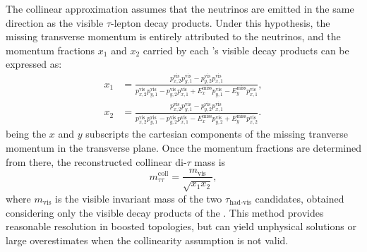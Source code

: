 The collinear approximation assumes that the neutrinos are emitted in the same direction as the visible $\tau$-lepton decay products. Under this hypothesis, the missing transverse momentum is entirely attributed to the neutrinos, and the momentum fractions $x_1$ and $x_2$ carried by each \taul's visible decay products can be expressed as: 
\begin{align}
    x_{1} &= 
    \frac{p_{x,2}^{\text{vis}} p_{y,1}^{\text{vis}} - p_{y,2}^{\text{vis}} p_{x,1}^{\text{vis}}}
         {p_{x,2}^{\text{vis}} p_{y,1}^{\text{vis}} - p_{y,2}^{\text{vis}} p_{x,1}^{\text{vis}} 
          + E_{x}^{\text{miss}} p_{y,1}^{\text{vis}} - E_{y}^{\text{miss}} p_{x,1}^{\text{vis}}}, \nonumber \\[8pt]
    x_{2} &= 
    \frac{p_{x,2}^{\text{vis}} p_{y,1}^{\text{vis}} - p_{y,2}^{\text{vis}} p_{x,1}^{\text{vis}}}
         {p_{x,2}^{\text{vis}} p_{y,1}^{\text{vis}} - p_{y,2}^{\text{vis}} p_{x,1}^{\text{vis}} 
          - E_{x}^{\text{miss}} p_{y,2}^{\text{vis}} + E_{y}^{\text{miss}} p_{x,2}^{\text{vis}}}.
    \end{align}
being the $x$ and $y$ subscripts the cartesian components of the missing tranverse momentum in the transverse plane. Once the momentum fractions are determined from there, the reconstructed collinear di-$\tau$ mass is
\begin{equation}
m_{\tau\tau}^{\text{coll}} = \frac{m_{\text{vis}}}{\sqrt{x_{1}x_{2}}},
\label{eq:mcoll}
\end{equation}
where $m_{\text{vis}}$ is the visible invariant mass of the two $\tau_{\text{had-vis}}$ candidates, obtained considering only the visible decay products of the \taul. This method provides reasonable resolution in boosted topologies, but can yield unphysical solutions or large overestimates when the collinearity assumption is not valid.  

